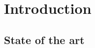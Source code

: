\documentclass[12pt,a4paper,twoside]{book}
\begin{document}






\chapter{Introduction}

\section{State of the art}
\end{document}
